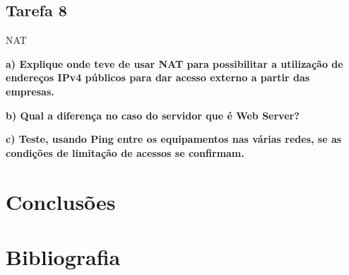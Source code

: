 \documentclass[11pt,english, openright, oneside]{book}
\newcommand\blankpage{%
    \null
    \thispagestyle{empty}%
    \newpage}
\begin{document}
\vspace{0.8cm}

\pagebreak
\section{Tarefa 8}
\vspace{0.2cm}

NAT 
\vspace{0.8cm}

\textbf{a) Explique onde teve de usar NAT para possibilitar a utilização de endereços IPv4 públicos para dar acesso externo a partir das empresas.}
\vspace{0.2cm}





\vspace{0.8cm}

\textbf{b) Qual a diferença no caso do servidor que é Web Server?}
\vspace{0.2cm}





\vspace{0.8cm}

\textbf{c) Teste, usando Ping entre os equipamentos nas várias redes, se as condições de limitação de acessos se confirmam.}
\vspace{0.2cm}



\pagebreak
\chapter{Conclusões}



\chapter{Bibliografia}



\mainmatter



\afterpage{\blankpage}
\end{document}
